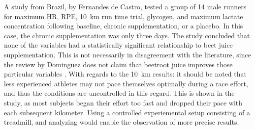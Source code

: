 A study from Brazil, by Fernandes  de  Castro, tested a group of 14 male runners for maximum HR, RPE, \SI{10}{km} run time trial, glycogen, and maximum lactate concentration following baseline, chronic supplementation, or a placebo\cite[19]{de2019effect}. In this case, the chronic supplementation was only three days. The study concluded that none of the variables had a statistically significant relationship to beet juice supplementation\cite{de2019effect}. This is not necessarily in disagreement with the literature, since the review by Dominguez does not claim that beetroot juice improves those particular variables \cite{dominguez2017effects}.
With regards to the \SI{10}{km} results: it should be noted that less experienced athletes may not pace themselves optimally during a race effort, and thus the conditions are uncontrolled in this regard. This is shown in the study, as most subjects began their effort too fast and dropped their pace with each subsequent kilometer\cite[20]{de2019effect}.  Using a controlled experiemental setup consisting of a treadmill, and analyzing \vot{} would enable the observation of more precise results.
